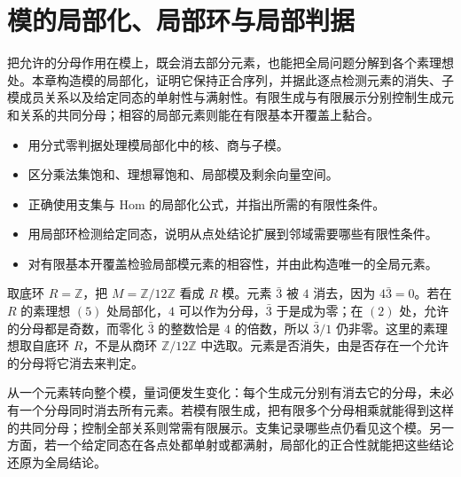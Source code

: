 
\chapter{模的局部化、局部环与局部判据}
\label{b3:ch:02}

\begin{chapterabstract}
	把允许的分母作用在模上，既会消去部分元素，也能把全局问题分解到各个素理想处。本章构造模的局部化，证明它保持正合序列，并据此逐点检测元素的消失、子模成员关系以及给定同态的单射性与满射性。有限生成与有限展示分别控制生成元和关系的共同分母；相容的局部元素则能在有限基本开覆盖上黏合。
\end{chapterabstract}

\begin{learninggoals}
	\begin{itemize}
		\item 用分式零判据处理模局部化中的核、商与子模。
		\item 区分乘法集饱和、理想幂饱和、局部模及剩余向量空间。
		\item 正确使用支集与 Hom 的局部化公式，并指出所需的有限性条件。
		\item 用局部环检测给定同态，说明从点处结论扩展到邻域需要哪些有限性条件。
		\item 对有限基本开覆盖检验局部模元素的相容性，并由此构造唯一的全局元素。
	\end{itemize}
\end{learninggoals}

取底环 \(R=\mathbb Z\)，把 \(M=\mathbb Z/12\mathbb Z\) 看成 \(R\) 模。元素 \(\bar3\) 被 \(4\) 消去，因为 \(4\bar3=0\)。若在 \(R\) 的素理想 \((5)\) 处局部化，\(4\) 可以作为分母，\(\bar3\) 于是成为零；在 \((2)\) 处，允许的分母都是奇数，而零化 \(\bar3\) 的整数恰是 \(4\) 的倍数，所以 \(\bar3/1\) 仍非零。这里的素理想取自底环 \(R\)，不是从商环 \(\mathbb Z/12\mathbb Z\) 中选取。元素是否消失，由是否存在一个允许的分母将它消去来判定。

\ProseParagraphBreak

从一个元素转向整个模，量词便发生变化：每个生成元分别有消去它的分母，未必有一个分母同时消去所有元素。若模有限生成，把有限多个分母相乘就能得到这样的共同分母；控制全部关系则常需有限展示。支集记录哪些点仍看见这个模。另一方面，若一个给定同态在各点处都单射或都满射，局部化的正合性就能把这些结论还原为全局结论。

\ProseParagraphBreak

